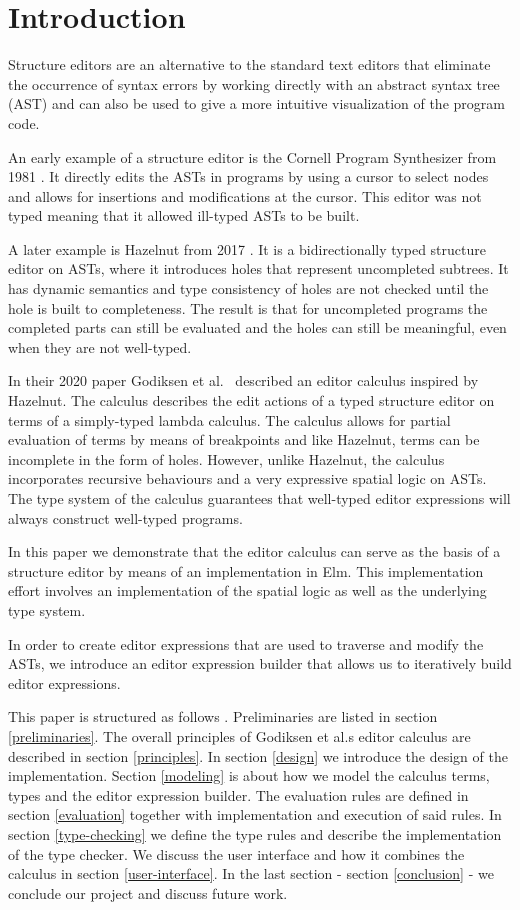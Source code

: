 \section{Introduction}
\label{introduction}

Structure editors are an alternative to the standard text editors that
eliminate the occurrence of syntax errors by working directly with an
abstract syntax tree (AST) and can also be used to give a more intuitive
visualization of the program code.

An early example of a structure editor is the Cornell Program Synthesizer
from 1981 \cornell. It directly edits the ASTs in programs by using a cursor to
select nodes and allows for insertions and modifications at the cursor. This
editor was not typed meaning that it allowed ill-typed ASTs to be built.

A later example is Hazelnut from 2017 \hazel. It is a bidirectionally typed
structure editor on ASTs, where it introduces holes that represent uncompleted
subtrees. It has dynamic semantics and type consistency of holes are not
checked until the hole is built to completeness. The result is that for
uncompleted programs the completed parts can still be evaluated and the holes
can still be meaningful, even when they are not well-typed.

In their 2020 paper Godiksen et al. \pepm~described an editor calculus
inspired by Hazelnut. The calculus describes the edit actions of a 
typed structure editor on terms of a simply-typed lambda
calculus. The calculus allows for partial evaluation of terms by means
of breakpoints and like Hazelnut, terms can be incomplete in the form
of holes. However, unlike Hazelnut, the calculus incorporates recursive
behaviours and a very expressive spatial logic on ASTs. The type
system of the calculus guarantees that well-typed editor expressions
will always construct well-typed programs.

In this paper we demonstrate that the editor calculus can serve as the
basis of a structure editor by means of an implementation in
Elm. This implementation effort involves an implementation of the
spatial logic as well as the underlying type system.

In order to create editor expressions that are used to traverse and modify the
ASTs, we introduce an editor expression builder that allows us to
iteratively build editor expressions.

This paper is structured as follows
. Preliminaries are listed in section
\ref{preliminaries}. The overall principles of Godiksen et al.s editor calculus
are described in section \ref{principles}. In section \ref{design} we introduce
the design of the implementation. Section \ref{modeling} is about how we model
the calculus terms, types and the editor expression builder. The evaluation
rules are defined in section \ref{evaluation} together with implementation and
execution of said rules. In section \ref{type-checking} we define the type
rules and describe the implementation of the type checker. We discuss the user
interface and how it combines the calculus in section \ref{user-interface}. In
the last section - section \ref{conclusion} - we conclude our project and
discuss future work.


